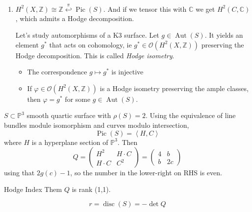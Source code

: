 \begin{enumerate}
	\item $H^{2}(X,\mathbb{Z})\cong \mathbb{Z}
	\overset{\pi}{\hookleftarrow}
	\operatorname{Pic}(S)
	$. And if we tensor this with $\mathbb{C}$
	we get $H^{2}(C,\mathbb{C})$, which admits a
	Hodge decomposition.

		Let's study automorphisms of a K3 surface.
		Let $g\in\operatorname{Aut}(S)$. It yields
		an element $g^*$ that acts on cohomology,
		ie $g^*\in\mathcal{O}(H^{2}(X,\mathbb{Z}))$
		preserving the Hodge decomposition. This is
		called {\it Hodge isometry}.

\begin{theorem}\leavevmode
\label{theorem-global-torelli-k3}
	\begin{itemize}
	\item The correspondence $g\mapsto g^*$ is
	injective
	
	\item If
	$\varphi\in\mathcal{O}(H^{2}(X,\mathbb{Z}))$
	is a Hodge isometry preserving the ample
	classes, then $\varphi=g^*$ for some
	$g\in\operatorname{Aut}(S)$.
	\end{itemize}
\end{theorem}
\end{enumerate}

\begin{example}
	$S\subset \mathbb{P}^3$ smooth quartic
	surface with $\rho(S)=2$. Using the
	equivalence of line bundles module
	isomorphism and curves modulo intersection,
	$$\operatorname{Pic}(S)= \left\langle{}H,C\right\rangle{} $$
	where $H$ is a hyperplane section of
	$\mathbb{P}^3$. Then
	$$Q=\begin{pmatrix} H^2& H\cdot C\\H\cdot C&
	C^2 \end{pmatrix} =\begin{pmatrix} 4&b\\b&2c
	\end{pmatrix} $$
	using that $2g(c)-1$, so the number in the
	lower-right on RHS is even.
\end{example}

\begin{remark}
	Hodge Index Them $Q$ is rank (1,1).
\end{remark}

\begin{definition}[Discriminant]
	$$r=\operatorname{disc}(S)=-\det Q$$
\end{definition}


